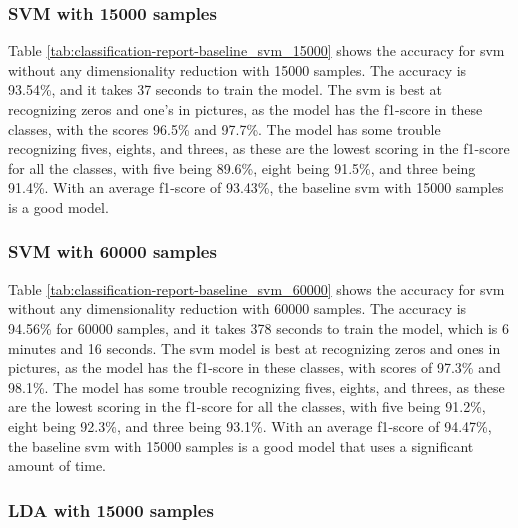 \subsubsection{SVM with 15000 samples}\label{subsubsec:experiment-1-results-svm-15000}

Table \ref{tab:classification-report-baseline_svm_15000} shows the accuracy for \gls{svm} without any dimensionality reduction with 15000 samples. The accuracy is 93.54\%, and it takes 37 seconds to train the model. The \gls{svm} is best at recognizing zeros and one's in pictures, as the model has the f1-score in these classes, with the scores 96.5\% and 97.7\%. The model has some trouble recognizing fives, eights, and threes, as these are the lowest scoring in the f1-score for all the classes, with five being 89.6\%, eight being 91.5\%, and three being 91.4\%. With an average f1-score of 93.43\%, the baseline \gls{svm} with 15000 samples is a good model. 

\subsubsection{SVM with 60000 samples}\label{subsubsec:experiment-1-results-svm-60000}

Table \ref{tab:classification-report-baseline_svm_60000} shows the accuracy for \gls{svm} without any dimensionality reduction with 60000 samples. The accuracy is 94.56\% for 60000 samples, and it takes 378 seconds to train the model, which is 6 minutes and 16 seconds. The \gls{svm} model is best at recognizing zeros and ones in pictures, as the model has the f1-score in these classes, with scores of 97.3\% and 98.1\%. The model has some trouble recognizing fives, eights, and threes, as these are the lowest scoring in the f1-score for all the classes, with five being 91.2\%, eight being 92.3\%, and three being 93.1\%. With an average f1-score of 94.47\%, the baseline \gls{svm} with 15000 samples is a good model that uses a significant amount of time.

\subsubsection{LDA with 15000 samples}\label{subsubsec:experiment-1-results-lda-15000}

